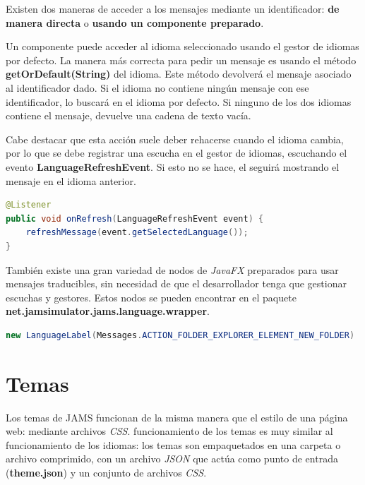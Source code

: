 Existen dos maneras de acceder a los mensajes mediante un identificador:
\textbf{de manera directa} o \textbf{usando un componente preparado}.

\noindent Un componente puede acceder al idioma seleccionado usando
el gestor de idiomas por defecto.
La manera más correcta para pedir un mensaje es usando el método
\textbf{getOrDefault(String)} del idioma.
Este método devolverá el mensaje asociado al identificador dado.
Si el idioma no contiene ningún mensaje con ese identificador,
lo buscará en el idioma por defecto.
Si ninguno de los dos idiomas contiene el mensaje,
devuelve una cadena de texto vacía.

\noindent Cabe destacar que esta acción suele deber rehacerse cuando
el idioma cambia, por lo que se debe registrar una escucha en el
gestor de idiomas, escuchando el evento \textbf{LanguageRefreshEvent}.
Si esto no se hace, el seguirá mostrando el mensaje en el idioma
anterior.

\begin{lstlisting}[language=Java,style=java,frame=single,label={lst:idioma-escucha}]
@Listener
public void onRefresh(LanguageRefreshEvent event) {
    refreshMessage(event.getSelectedLanguage());
}
\end{lstlisting}

\noindent También existe una gran variedad de nodos de \textit{JavaFX} preparados
para usar mensajes traducibles, sin necesidad de que el desarrollador tenga que
gestionar escuchas y gestores.
Estos nodos se pueden encontrar en el paquete
\textbf{net.jamsimulator.jams.language.wrapper}.

\begin{lstlisting}[language=Java,style=java,frame=single,label={lst:idioma-nodo}]
new LanguageLabel(Messages.ACTION_FOLDER_EXPLORER_ELEMENT_NEW_FOLDER)
\end{lstlisting}


\section{Temas}\label{sec:temas}

Los temas de JAMS funcionan de la misma manera que el estilo de una página web:
mediante archivos \textit{CSS}.
funcionamiento de los temas es muy similar al funcionamiento de los idiomas:
los temas son empaquetados en una carpeta o archivo comprimido,
con un archivo \textit{JSON} que actúa como punto de entrada (\textbf{theme.json})
y un conjunto de archivos \textit{CSS}.

